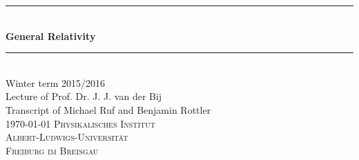 \newcommand{\HRule}{\rule{\linewidth}{0.5mm}}
\begin{titlepage}
\begin{center}
  \HRule \\[0.4cm]
  { \huge \bfseries General Relativity}\\
  \HRule \\[0.5cm]
  \large Winter term 2015/2016 \\[0.5cm]  
  Lecture of Prof. Dr. J. J. van der Bij \\
  Transcript of Michael Ruf and Benjamin Rottler \\[1.5cm]
  \today
  \vfill
  \normalsize
  \textsc{Physikalisches Institut} \\
  \textsc{Albert-Ludwigs-Universität} \\
  \textsc{Freiburg im Breisgau}
\end{center}
\end{titlepage}